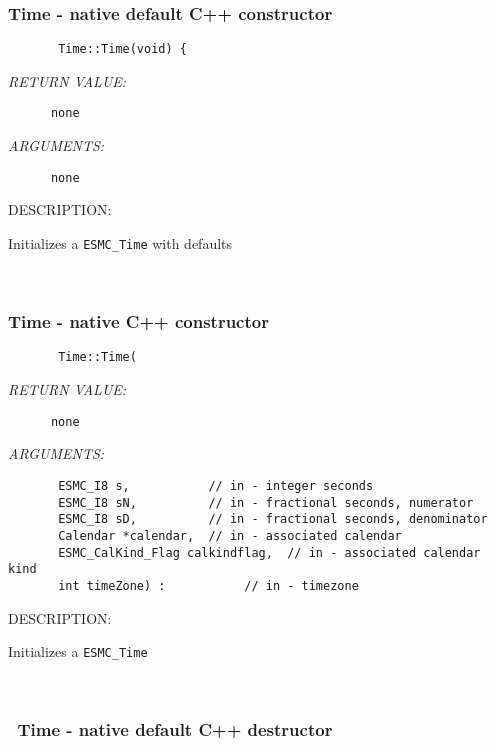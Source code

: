 \subsubsection [Time] {Time - native default C++ constructor}


  
\begin{verbatim}       Time::Time(void) {\end{verbatim}{\em RETURN VALUE:}
\begin{verbatim}      none\end{verbatim}{\em ARGUMENTS:}
\begin{verbatim}      none\end{verbatim}
{\sf DESCRIPTION:\\ }


        Initializes a {\tt ESMC\_Time} with defaults
   
 
\mbox{}\hrulefill\ 
 
\subsubsection [Time] {Time - native C++ constructor}


  
\begin{verbatim}       Time::Time(\end{verbatim}{\em RETURN VALUE:}
\begin{verbatim}      none\end{verbatim}{\em ARGUMENTS:}
\begin{verbatim}       ESMC_I8 s,           // in - integer seconds
       ESMC_I8 sN,          // in - fractional seconds, numerator
       ESMC_I8 sD,          // in - fractional seconds, denominator
       Calendar *calendar,  // in - associated calendar
       ESMC_CalKind_Flag calkindflag,  // in - associated calendar kind
       int timeZone) :           // in - timezone\end{verbatim}
{\sf DESCRIPTION:\\ }


        Initializes a {\tt ESMC\_Time}
   
 
\mbox{}\hrulefill\ 
 
\subsubsection [~Time] {~Time - native default C++ destructor}


